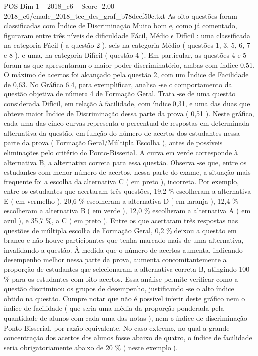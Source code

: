 \begin{textsample}{POS Dim 1 – 2018\_c6 – Score -2.00 – 2018\_c6/enade\_2018\_tec\_des\_graf\_b78dccf50c.txt}
As oito questões foram classificadas com Índice de Discriminação Muito bom e, como já comentado, figuraram entre três níveis de dificuldade Fácil, Médio e Difícil : uma classificada na categoria Fácil ( a questão 2 ), seis na categoria Médio ( questões 1, 3, 5, 6, 7 e 8 ), e uma, na categoria Difícil ( questão 4 ).
Em particular, as questões 4 e 5 foram as que apresentaram o maior poder discriminatório, ambas com índice 0,51.
O máximo de acertos foi alcançado pela questão 2, com um Índice de Facilidade de 0,63.
No Gráfico 6.4, para exemplificar, analisa -se o comportamento da questão objetiva de número 4 de Formação Geral.
Trata -se de uma questão considerada Difícil, em relação à facilidade, com índice 0,31, e uma das duas que obteve maior Índice de Discriminação dessa parte da prova ( 0,51 ).
Neste gráfico, cada uma das cinco curvas representa o percentual de respostas em determinada alternativa da questão, em função do número de acertos dos estudantes nessa parte da prova ( Formação Geral/Múltipla Escolha ), antes de possíveis eliminações pelo critério do Ponto-Bisserial.
A curva em verde corresponde à alternativa B, a alternativa correta para essa questão.
Observa -se que, entre os estudantes com menor número de acertos, nessa parte do exame, a situação mais frequente foi a escolha da alternativa C ( em preto ), incorreta.
Por exemplo, entre os estudantes que acertaram três questões, 19,2 \% escolheram a alternativa E ( em vermelho ), 20,6 \% escolheram a alternativa D ( em laranja ), 12,4 \% escolheram a alternativa B ( em verde ), 12,0 \% escolheram a alternativa A ( em azul ), e 35,7 \%, a C ( em preto ).
Entre os que acertaram três respostas nas questões de múltipla escolha de Formação Geral, 0,2 \% deixou a questão em branco e não houve participantes que tenha marcado mais de uma alternativa, invalidando a questão.
À medida que o número de acertos aumenta, indicando desempenho melhor nessa parte da prova, aumenta concomitantemente a proporção de estudantes que selecionaram a alternativa correta B, atingindo 100 \% para os estudantes com oito acertos.
Essa análise permite verificar como a questão discriminou os grupos de desempenho, justificando -se o alto índice obtido na questão.
Cumpre notar que não é possível inferir deste gráfico nem o índice de facilidade ( que seria uma média da proporção ponderada pela quantidade de alunos com cada uma das notas ), nem o índice de discriminação Ponto-Bisserial, por razão equivalente.
No caso extremo, no qual a grande concentração dos acertos dos alunos fosse abaixo de quatro, o índice de facilidade seria obrigatoriamente abaixo de 20 \% ( neste exemplo ).

\end{textsample}
